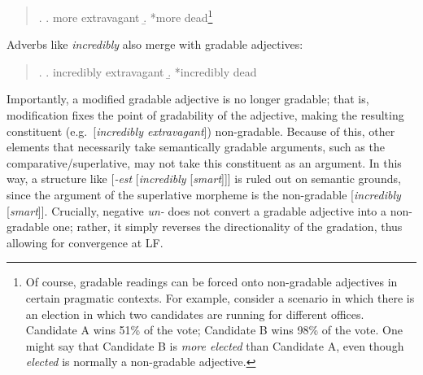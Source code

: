 \singlespacing
\begin{quote}
\ex.
\a. more extravagant
\b. *more dead\footnote{\label{force_grad_fn}Of course, gradable readings can be forced onto non-gradable adjectives in certain pragmatic contexts. For example, consider a scenario in which there is an election in which two candidates are running for different offices. Candidate A wins 51\% of the vote; Candidate B wins 98\% of the vote. One might say that Candidate B is {\it more elected} than Candidate A, even though {\it elected} is normally a non-gradable adjective.}

\end{quote}
\onehalfspacing
Adverbs like {\it incredibly} also merge with gradable adjectives:
\singlespacing
\begin{quote}
\begin{minipage}{5in}
\ex.
\a. incredibly extravagant
\b. *incredibly dead

\end{minipage}
\end{quote}
\onehalfspacing
Importantly, a modified gradable adjective is no longer gradable; that is, modification fixes the point of gradability of the adjective, making the resulting constituent (e.g.\ [{\it incredibly extravagant}]) non-gradable. Because of this, other elements that necessarily take semantically gradable arguments, such as the comparative/superlative, may not take this constituent as an argument. In this way, a structure like [{\it -est} [{\it incredibly} [{\it smart}]]] is ruled out on semantic grounds, since the argument of the superlative morpheme is the non-gradable [{\it incredibly} [{\it smart}]]. Crucially, negative {\it un-} does not convert a gradable adjective into a non-gradable one; rather, it simply reverses the directionality of the gradation, thus allowing for convergence at LF.

